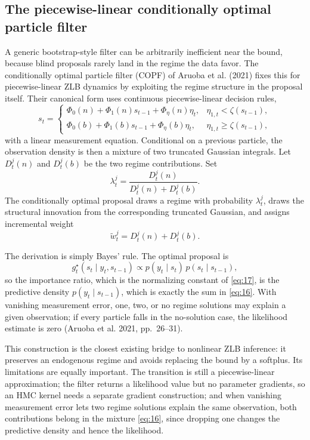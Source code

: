 \documentclass[11pt]{article}
\begin{document}
\subsection{The piecewise-linear conditionally optimal particle filter}
\label{sec:copf}

A generic bootstrap-style filter can be arbitrarily inefficient near the
bound, because blind proposals rarely land in the regime the data favor. The
conditionally optimal particle filter (COPF) of Aruoba et al. (2021) fixes
this for piecewise-linear ZLB dynamics by exploiting the regime structure in
the proposal itself. Their canonical form uses continuous piecewise-linear
decision rules,
\begin{equation}\label{eq:14}
 s_t=
 \begin{cases}
 \Phi_0(n)+\Phi_1(n)s_{t-1}+\Phi_\eta(n)\eta_t,&
 \eta_{1,t}<\zeta(s_{t-1}),\\[2pt]
 \Phi_0(b)+\Phi_1(b)s_{t-1}+\Phi_\eta(b)\eta_t,&
 \eta_{1,t}\geq\zeta(s_{t-1}),
 \end{cases}
\end{equation}
with a linear measurement equation. Conditional on a previous particle, the
observation density is then a mixture of two truncated Gaussian integrals.
Let $D_t^j(n)$ and $D_t^j(b)$ be the two regime contributions. Set
\begin{equation}\label{eq:15}
 \lambda_t^j=\frac{D_t^j(n)}{D_t^j(n)+D_t^j(b)}.
\end{equation}
The conditionally optimal proposal draws a regime with probability
$\lambda_t^j$, draws the structural innovation from the corresponding
truncated Gaussian, and assigns incremental weight
\begin{equation}\label{eq:16}
 \widetilde w_t^j=D_t^j(n)+D_t^j(b).
\end{equation}

The derivation is simply Bayes' rule. The optimal proposal is
\begin{equation}\label{eq:17}
 g_t^\star(s_t\mid y_t,s_{t-1})
 \propto p(y_t\mid s_t)\,p(s_t\mid s_{t-1}),
\end{equation}
so the importance ratio, which is the normalizing constant of \eqref{eq:17}, is
the predictive density $p(y_t\mid s_{t-1})$, which is exactly the sum in
\eqref{eq:16}. With vanishing measurement error, one, two, or no regime
solutions may explain a given observation; if every particle falls in the
no-solution case, the likelihood estimate is zero (Aruoba et al. 2021,
pp.~26--31).

This construction is the closest existing bridge to nonlinear ZLB inference:
it preserves an endogenous regime and avoids replacing the bound by a
softplus. Its limitations are equally important. The transition is still a
piecewise-linear approximation; the filter returns a likelihood value but no
parameter gradients, so an HMC kernel needs a separate gradient
construction; and when vanishing measurement error lets two regime
solutions explain the same observation, both contributions belong in the
mixture \eqref{eq:16}, since dropping one changes the predictive density
and hence the likelihood.
\end{document}
